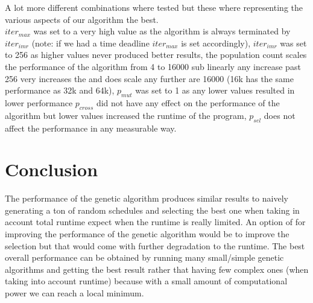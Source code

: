 \documentclass{article}
\begin{document}
 A lot more different combinations where tested but these where representing the various aspects of our algorithm the best.\\

$iter_{max}$ was set to a very high value as the algorithm is always terminated by $iter_{imr}$ (note: if we had a time deadline $iter_{max}$ is set accordingly),
$iter_{imr}$ was set to 256 as higher values never produced better results,
the population count scales the performance of the algorithm from 4 to 16000 sub linearly any increase past 256 very increases the and does scale any further are 16000 (16k has the same performance as 32k and 64k),
$p_{mut}$ was set to 1 as any lower values resulted in lower performance
$p_{cross}$ did not have any effect on the performance of the algorithm but lower values increased the runtime of the program,
$p_{sel}$ does not affect the performance in any measurable way.
\section*{Conclusion}
The performance of the genetic algorithm produces similar results to naively generating a ton of random schedules and selecting the best one when taking in account total runtime expect when the runtime is really limited.
An option of for improving the performance of the genetic algorithm would be to improve the selection but that would come with further degradation to the runtime.
The best overall performance can be obtained by running many small/simple genetic algorithms and getting the best result rather that having few complex ones (when taking into account runtime) because with a small amount of computational power we can reach a local minimum.
\end{document}
